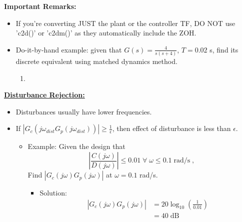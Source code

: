 \textbf{Important Remarks:}
\begin{itemize}
    \item If you're converting JUST the plant or the controller TF, DO NOT use 'c2d()' or 'c2dm()' as they automatically include the ZOH.
    \item Do-it-by-hand example: given that $G(s)=\frac{4}{s(s+4)}$, $T=0.02$ s, find its discrete equivalent using matched dynamics method.
    \begin{enumerate}
        \item 
    \end{enumerate}
\end{itemize}

\textbf{\large \underline{Disturbance Rejection:}}
\begin{itemize}
    \item Disturbances usually have lower frequencies.
    \item If $|G_{c}(j\omega_{dist}G_p(j\omega_{dist}))|\geq \frac{1}{\epsilon}$, then effect of disturbance is less than $\epsilon$.
    \begin{itemize}
        \item Example: Given the design that
        \begin{equation*}
            \left|\frac{C(j\omega)}{D(j\omega)}\right|\leq 0.01 \; \forall \; \omega \leq 0.1 \; \text{rad/s}\; ,
        \end{equation*}
        Find $|G_c(j\omega)G_p(j\omega)|$ at $\omega = 0.1$ rad/s.
        \begin{itemize}
            \item Solution:
            \begin{align*}
             |G_c(j\omega)G_p(j\omega)|&=20\log_{10}(\frac{1}{0.01}) \\
             &=40 \; \text{dB}
            \end{align*}
        \end{itemize}
    \end{itemize}
\end{itemize}

